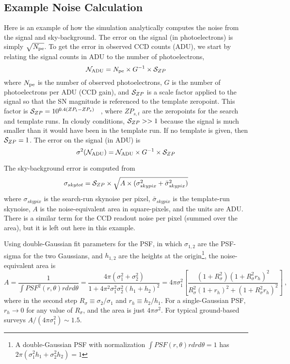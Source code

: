 \documentclass[12pt]{article}
\newcommand{\Rsig}{R_{\sigma}}
\newcommand{\rh}{r_{h}}
\newcommand{\SZP}{{\cal S}_{ZP}}
\newcommand{\NADU}{ {\cal N}_{\rm ADU}}
\newcommand{\Npe}{N_{\rm pe}}
\begin{document}
{%
   \clearpage
   \subsection{Example Noise Calculation}
   \label{subsec:noise_calc}

Here is an example of how the simulation analytically computes the 
noise from the signal and sky-background.
The error on the signal (in photoelectrons) is simply $\sqrt{\Npe}$.
To get the error in observed CCD counts (ADU),
we start by relating the signal counts in ADU to the
number of photoelectrons,
%
\begin{equation}
  \NADU = \Npe \times G^{-1} \times \SZP
\end{equation}
%
where 
$\Npe$ is the number of observed photoelectrons,
$G$ is the number of photoelectrons per ADU (CCD gain),
and $\SZP$ is a scale factor applied to the signal so 
that the SN magnitude is referenced to the template zeropoint.
This factor is
%
   $\SZP = 10^{0.4(ZP_t - ZP_s)} $ ~,
%
where $ZP_{s,t}$ are the zeropoints for the search and template runs.
In cloudy conditions, $\SZP >> 1$ because the signal is much smaller
than it would have been in the template run.
If no template is given, then $\SZP = 1$.
The error on the signal (in ADU) is
%
\begin{equation}
   \sigma^2(\NADU) = \NADU \times G^{-1} \times \SZP
   \label{eq:sigmaNADU}
\end{equation}

\bigskip
The sky-background error is computed from
%
\begin{equation}
   \sigma_{skytot} = 
   \SZP \times 
   \sqrt{ A \times (\sigma_{skypix}^2 + \bar{\sigma}_{skypix}^2 ) }
\end{equation}
%
where $\sigma_{skypix}$ is the search-run skynoise per pixel,
$\bar{\sigma}_{skypix}$ is the template-run skynoise,
$A$ is the noise-equivalent area in square-pixels, 
and the units are ADU.
There is a similar term for the CCD readout noise per pixel
(summed over the area), but it is left out here in this example.


Using double-Gaussian fit
parameters for the PSF, in which $\sigma_{1,2}$ are the
PSF-sigma for the two Gaussians, and $h_{1,2}$ are the
heights at the origin\footnote{A double-Gaussian PSF with normalization
  $\int PSF(r,\theta) r drd\theta = 1$
  has $2\pi(\sigma_1^2 h_1 + \sigma_2^2 h_2) = 1$}, 
the noise-equivalent area is
%
\begin{equation}
   A = \frac{1}{\int PSF^2(r,\theta) r dr d\theta}
  = \frac{4\pi ( \sigma_1^2 + \sigma_2^2) }
    {1 + 4\pi^2\sigma_1^2\sigma_2^2(h_1 + h_2)^2 }
  = 4\pi\sigma_1^2 \left[ 
      \frac{ (1+\Rsig^2)(1+\Rsig^2\rh)^2 }{\Rsig^2(1+\rh)^2 + (1+\Rsig^2\rh)^2}
      \right]~,
   \label{eq:NEA_formula}
\end{equation}
%
where in the second step $\Rsig \equiv \sigma_2/\sigma_1$
and $\rh \equiv h_2/h_1$.
For a single-Gaussian PSF, $\rh \to 0$ for any value of $\Rsig$,
and the area is just $4\pi\sigma^2$.
For typical ground-based surveys $A/(4\pi\sigma_1^2) \sim 1.5$.



}
\end{document}
